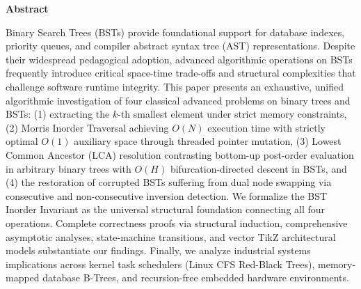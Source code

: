 \documentclass[10pt,twocolumn,letterpaper]{article}
\begin{document}

\thispagestyle{firstpage}

\begin{center}
  {\bfseries\large Abstract}
\end{center}
\vspace{-0.5em}
{\small Binary Search Trees (BSTs) provide foundational support for database indexes, priority queues, and compiler abstract syntax tree (AST) representations. Despite their widespread pedagogical adoption, advanced algorithmic operations on BSTs frequently introduce critical space-time trade-offs and structural complexities that challenge software runtime integrity. This paper presents an exhaustive, unified algorithmic investigation of four classical advanced problems on binary trees and BSTs: (1) extracting the $k$-th smallest element under strict memory constraints, (2) Morris Inorder Traversal achieving $O(N)$ execution time with strictly optimal $O(1)$ auxiliary space through threaded pointer mutation, (3) Lowest Common Ancestor (LCA) resolution contrasting bottom-up post-order evaluation in arbitrary binary trees with $O(H)$ bifurcation-directed descent in BSTs, and (4) the restoration of corrupted BSTs suffering from dual node swapping via consecutive and non-consecutive inversion detection. We formalize the BST Inorder Invariant as the universal structural foundation connecting all four operations. Complete correctness proofs via structural induction, comprehensive asymptotic analyses, state-machine transitions, and vector TikZ architectural models substantiate our findings. Finally, we analyze industrial systems implications across kernel task schedulers (Linux CFS Red-Black Trees), memory-mapped database B-Trees, and recursion-free embedded hardware environments.}
\end{document}
